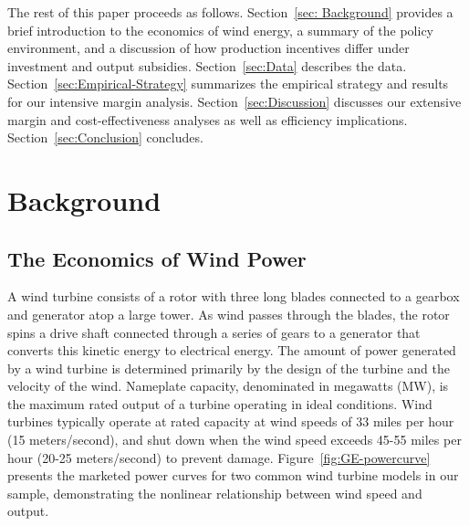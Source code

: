 \documentclass[12pt]{article}
\begin{document}
The rest of this paper proceeds as follows. Section~\ref{sec: Background} provides a brief introduction to the economics of wind energy, a summary of the policy environment, and a discussion of how production incentives differ under investment and output subsidies. Section~\ref{sec:Data} describes the data. Section~\ref{sec:Empirical-Strategy} summarizes the empirical strategy and results for our intensive margin analysis. Section~\ref{sec:Discussion} discusses our extensive margin and cost-effectiveness analyses as well as efficiency implications. Section~\ref{sec:Conclusion} concludes.

\section{Background \label{sec: Background}}

\subsection{The Economics of Wind Power \label{subsec:WindEcon}}

A wind turbine consists of a rotor with three long blades connected to a gearbox and generator atop a large tower. As wind passes through the blades, the rotor spins a drive shaft connected through a series of gears to a generator that converts this kinetic energy to electrical energy. The amount of power generated by a wind turbine is determined primarily by the design of the turbine and the velocity of the wind. Nameplate capacity, denominated in megawatts (MW), is the maximum rated output of a turbine operating in ideal conditions. Wind turbines typically operate at rated capacity at wind speeds of 33 miles per hour (15 meters/second), and shut down when the wind speed exceeds 45-55 miles per hour (20-25 meters/second) to prevent damage. Figure~\ref{fig:GE-powercurve} presents the marketed power curves for two common wind turbine models in our sample, demonstrating the nonlinear relationship between wind speed and output.
\end{document}
